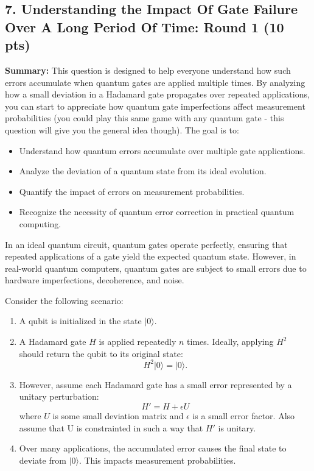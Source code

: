 \documentclass[12pt]{article}
\begin{document}
   
\subsection*{7. Understanding the Impact Of Gate Failure Over A Long Period Of Time: Round 1 (10 pts)}

\textbf{Summary:} This question is designed to help everyone understand how such errors accumulate when quantum gates are applied multiple times. By analyzing how a small deviation in a Hadamard gate propagates over repeated applications, you can start to appreciate how quantum gate imperfections affect measurement probabilities (you could play this same game with any quantum gate - this question will give you the general idea though). The goal is to:

\begin{itemize}
    \item Understand how quantum errors accumulate over multiple gate applications.
    \item Analyze the deviation of a quantum state from its ideal evolution.
    \item Quantify the impact of errors on measurement probabilities.
    \item Recognize the necessity of quantum error correction in practical quantum computing.
\end{itemize}


In an ideal quantum circuit, quantum gates operate perfectly, ensuring that repeated applications of a gate yield the expected quantum state. However, in real-world quantum computers, quantum gates are subject to small errors due to hardware imperfections, decoherence, and noise. 

Consider the following scenario:

\begin{enumerate}
    \item A qubit is initialized in the state \( |0\rangle \).
    \item A Hadamard gate \( H \) is applied repeatedly \( n \) times. Ideally, applying \( H^2 \) should return the qubit to its original state: 
    \[
    H^2 |0\rangle = |0\rangle.
    \]
    \item However, assume each Hadamard gate has a small error represented by a unitary perturbation:
    \[
    H' = H + \epsilon U
    \]
    where \( U \) is some small deviation matrix and \( \epsilon \) is a small error factor. Also assume that U is constrainted in such a way that $H'$ is unitary.
    \item Over many applications, the accumulated error causes the final state to deviate from \( |0\rangle \). This impacts measurement probabilities.
\end{enumerate}
\end{document}
